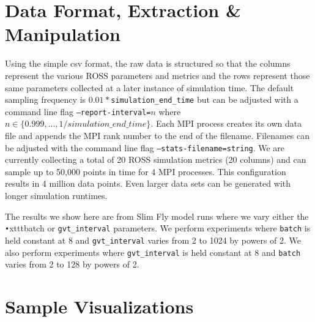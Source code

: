 \documentclass[12pt]{article}
\begin{document}
\section{Data Format, Extraction \& Manipulation} 

Using the simple csv format, the raw data is structured so that the columns represent the various ROSS parameters and metrics and the rows represent those same parameters collected at a later instance of simulation time. The default sampling frequency is $0.01*$\texttt{simulation\_end\_time} but can be adjusted with a command line flag \texttt{--report-interval=$n$} where $n\in \{0.999, ..., 1/simulation\_end\_time\}$. Each MPI process creates its own data file and appends the MPI rank number to the end of the filename. Filenames can be adjusted with the command line flag \texttt{--stats-filename=string}. We are currently collecting a total of 20 ROSS simulation metrics (20 columns) and can sample up to 50,000 points in time for 4 MPI processes. This configuration results in 4 million data points. Even larger data sets can be generated with longer simulation runtimes.

The results we show here are from Slim Fly model runs where we vary either the \texttt{•}xttt{batch} or \texttt{gvt\_interval} parameters.  We perform experiments where \texttt{batch} is held constant at 8 and \texttt{gvt\_interval} varies from 2 to 1024 by powers of 2.  We also perform experiments where \texttt{gvt\_interval} is held constant at 8 and \texttt{batch} varies from 2 to 128 by powers of 2.  


\section{Sample Visualizations}
\end{document}
